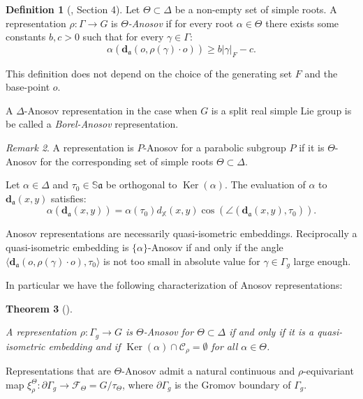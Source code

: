 \documentclass[reqno,10pt]{amsart}
\theoremstyle{plain}
\newtheorem{thm}{Theorem}[section]
\theoremstyle{definition}
\newtheorem{defn}[thm]{Definition}
\theoremstyle{remark}
\newtheorem{rem}[thm]{Remark}
\newcommand{\type}{\tau}
\newcommand{\typeS}{{\tau_0}}
\newcommand{\Sph}{\mathbb{S}}
\newcommand{\da}{\mathbf{d}_{\mathfrak{a}}}
\DeclareMathOperator{\Ker}{Ker}
\newcommand{\X}{\mathbb{X}}
\begin{document}
\begin{defn}[{\cite{BPS}, Section 4}]
\label{defn:Anosov}
Let $\Theta\subset \Delta$ be a non-empty set of simple roots. A representation $\rho:\Gamma \to G$ is \emph{$\Theta$-Anosov} if for every root $\alpha\in \Theta$ there exists some constants $b,c>0$ such that for every $\gamma\in \Gamma$:
$$\alpha\left(\da(o,\rho(\gamma)\cdot o)\right)\geq b|\gamma|_F-c.$$

This definition does not depend on the choice of the generating set $F$ and the base-point $o$.

\medskip

A $\Delta$-Anosov representation in the case when $G$ is a split real simple Lie group is be called a \emph{Borel-Anosov} representation.

\end{defn}

\begin{rem}
A representation is $P$-Anosov for a parabolic subgroup $P$ if it is $\Theta$-Anosov for the corresponding set of simple roots $\Theta\subset \Delta$.
\end{rem}

Let $\alpha\in \Delta$ and $\typeS\in \Sph \mathfrak{a}$ be orthogonal to $\Ker(\alpha)$. The evaluation of $\alpha$ to $\da(x,y)$ satisfies:
$$\alpha(\da(x,y))=\alpha(\type_0)d_\X(x,y)\cos\left(\angle(\da(x,y),\type_0)\right) .$$

Anosov representations are necessarily quasi-isometric embeddings. Reciprocally a quasi-isometric embedding is $\lbrace \alpha\rbrace $-Anosov if and only if the angle $\langle\da(o,\rho(\gamma)\cdot o),\type_0\rangle$ is not too small in absolute value for $\gamma\in \Gamma_g$ large enough. 

\medskip

In particular we have the following characterization of Anosov representations:

\begin{thm}[\cite{KLP}]
\label{thm:CaracAnosocQuasiIsom}

A representation $\rho:\Gamma_g\to G$ is $\Theta$-Anosov for $\Theta\subset\Delta$ if and only if it is a quasi-isometric embedding and if $\Ker(\alpha)\cap \mathcal{C}_\rho=\emptyset$ for all $\alpha\in \Theta$.
\end{thm}


\medskip

 Representations that are $\Theta$-Anosov admit a natural continuous and $\rho$-equivariant map $\xi^\Theta_\rho:\partial\Gamma_g\to \mathcal{F}_\Theta=G/\type_\Theta$, where $\partial\Gamma_g$ is the Gromov boundary of $\Gamma_g$. 
 
\end{document}
